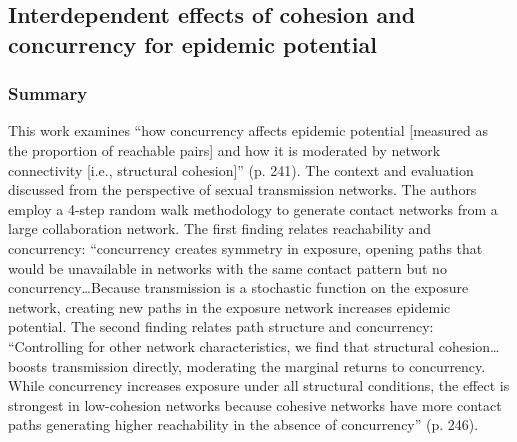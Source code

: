\subsection{Interdependent effects of cohesion and concurrency for epidemic potential}
\subsubsection*{Summary}
This work examines ``how concurrency affects epidemic potential [measured as the proportion of reachable pairs] and how it is moderated by network connectivity [i.e., structural cohesion]'' (p. 241). The context and evaluation discussed from the perspective of sexual transmission networks. The authors employ a 4-step random walk methodology to generate contact networks from a large collaboration network. The first finding relates reachability and concurrency: ``concurrency creates symmetry in exposure, opening paths that would be unavailable in networks with the same contact pattern but no concurrency{\ldots}Because transmission is a stochastic function on the exposure network, creating new paths in the exposure network increases epidemic potential. The second finding relates path structure and concurrency: ``Controlling for other network characteristics, we find that structural cohesion{\ldots}boosts transmission directly, moderating the marginal returns to concurrency. While concurrency increases exposure under all structural conditions, the effect is strongest in low-cohesion networks because cohesive networks have more contact paths generating higher reachability in the absence of concurrency'' (p. 246).
